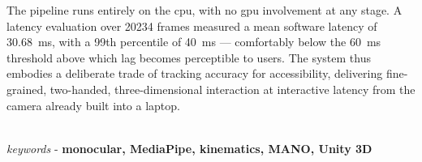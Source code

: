 The pipeline runs entirely on the \acrshort{cpu}, with no \acrshort{gpu}
involvement at any stage. A latency evaluation over \num{20234} frames
measured a mean software latency of \SI{30.68}{\ms}, with a 99th percentile
of \SI{40}{\ms} --- comfortably below the \SI{60}{\ms} threshold above which
lag becomes perceptible to users. The system thus embodies a deliberate
trade of tracking accuracy for accessibility, delivering fine-grained,
two-handed, three-dimensional interaction at interactive latency from the
camera already built into a laptop.

\noindent
\vspace{0.3cm}
\\ \textit{keywords} - \textbf{
    monocular,
    MediaPipe,
    kinematics,
    MANO,
    Unity 3D
}
